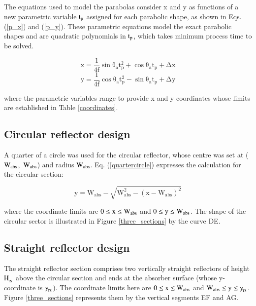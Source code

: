 The equations used to model the parabolas consider x and y as functions of a new parametric variable $\rm{t_p}$ assigned for each parabolic shape, as shown in Eqs. (\ref{p_x}) and (\ref{p_y}). These parametric equations model the exact parabolic shapes and are quadratic polynomials in $\rm{t_p}$, which takes minimum process time to be solved. 

\begin{equation}
	\mathrm{x = \frac{1}{4f}\sin\theta_a t_{p}^2 + \cos\theta_a t_p + \Delta x}
	\label{p_x}
\end{equation}
\vspace*{-0.75cm}
\begin{equation}
	\mathrm{y = \frac{1}{4f}\cos\theta_a t_{p}^2 - \sin\theta_a t_p + \Delta y}
	\label{p_y}
\end{equation}

\noindent where the parametric variables range to provide x and y coordinates whose limits are established in Table \ref{coordinates}.

\subsection{Circular reflector design}

A quarter of a circle was used for the circular reflector, whose centre was set at \mbox{($\rm{W_{abs}}$, $\rm{W_{abs}}$)} and radius $\rm{W_{abs}}$. Eq. (\ref{quartercircle}) expresses the calculation for the circular section:

\begin{equation}
	\mathrm{{y} = {W_{abs}} - \sqrt {\mathrm{W_{abs}^2 - {{\left( {{x} - {W_{abs}}} \right)}^2}}}}
	\label{quartercircle}
\end{equation}

\noindent where the coordinate limits are $\rm{0 \le {x} \le {W_{abs}}}$ and $\rm{0 \le {y} \le {W_{abs}}}$. The shape of the circular sector is illustrated in Figure \ref{three_sections} by the curve DE. 

\subsection{Straight reflector design}

The straight reflector section comprises two vertically straight reflectors of height $\rm{H_{\!_{TS}}}$ above the circular section and ends at the absorber surface (whose y-coordinate is $\rm{y_{\!_{TS}}}$). The coordinate limits here are $\rm{0 \le {x} \le {W_{abs}}}$ and $\rm{W_{abs} \le {y} \le {y_{\!_{TS}}}}$. Figure \ref{three_sections} represents them by the vertical segments EF and AG.

